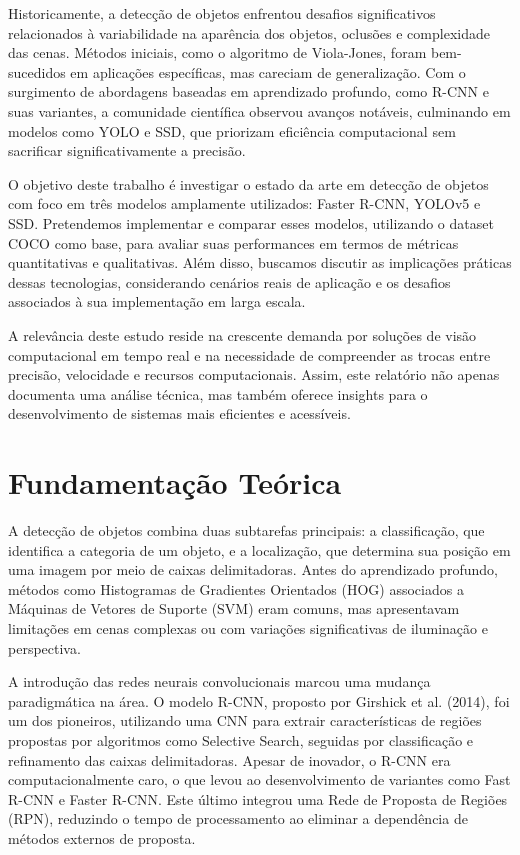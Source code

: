\documentclass[a4paper,12pt]{article}
\begin{document}
	Historicamente, a detecção de objetos enfrentou desafios significativos relacionados à variabilidade na aparência dos objetos, oclusões e complexidade das cenas. Métodos iniciais, como o algoritmo de Viola-Jones, foram bem-sucedidos em aplicações específicas, mas careciam de generalização. Com o surgimento de abordagens baseadas em aprendizado profundo, como R-CNN e suas variantes, a comunidade científica observou avanços notáveis, culminando em modelos como YOLO e SSD, que priorizam eficiência computacional sem sacrificar significativamente a precisão.
	
	O objetivo deste trabalho é investigar o estado da arte em detecção de objetos com foco em três modelos amplamente utilizados: Faster R-CNN, YOLOv5 e SSD. Pretendemos implementar e comparar esses modelos, utilizando o dataset COCO como base, para avaliar suas performances em termos de métricas quantitativas e qualitativas. Além disso, buscamos discutir as implicações práticas dessas tecnologias, considerando cenários reais de aplicação e os desafios associados à sua implementação em larga escala.
	
	A relevância deste estudo reside na crescente demanda por soluções de visão computacional em tempo real e na necessidade de compreender as trocas entre precisão, velocidade e recursos computacionais. Assim, este relatório não apenas documenta uma análise técnica, mas também oferece insights para o desenvolvimento de sistemas mais eficientes e acessíveis.
	
	\section{Fundamentação Teórica}
	A detecção de objetos combina duas subtarefas principais: a classificação, que identifica a categoria de um objeto, e a localização, que determina sua posição em uma imagem por meio de caixas delimitadoras. Antes do aprendizado profundo, métodos como Histogramas de Gradientes Orientados (HOG) associados a Máquinas de Vetores de Suporte (SVM) eram comuns, mas apresentavam limitações em cenas complexas ou com variações significativas de iluminação e perspectiva.
	
	A introdução das redes neurais convolucionais marcou uma mudança paradigmática na área. O modelo R-CNN, proposto por Girshick et al. (2014), foi um dos pioneiros, utilizando uma CNN para extrair características de regiões propostas por algoritmos como Selective Search, seguidas por classificação e refinamento das caixas delimitadoras. Apesar de inovador, o R-CNN era computacionalmente caro, o que levou ao desenvolvimento de variantes como Fast R-CNN e Faster R-CNN. Este último integrou uma Rede de Proposta de Regiões (RPN), reduzindo o tempo de processamento ao eliminar a dependência de métodos externos de proposta.
	
\end{document}
